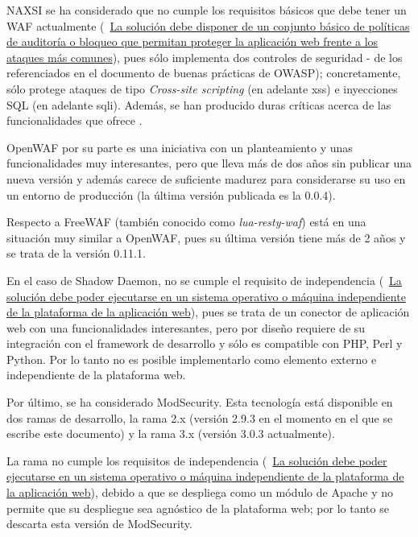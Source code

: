 \par NAXSI se ha considerado que no cumple los requisitos básicos que debe tener un WAF actualmente ({~\hyperref[req:commonattacks]{La solución debe
disponer de un conjunto básico de políticas de auditoría o bloqueo que permitan proteger la aplicación web frente a los ataques más comunes}}), pues
sólo implementa dos controles de seguridad - de los referenciados en el documento de buenas prácticas de OWASP\cite[apartado A3.2]{owaspbestpractices});
concretamente, sólo protege ataques de tipo {\em Cross-site scripting} (en adelante \acrshort{xss}\cite{owaspxss}) e inyecciones SQL (en adelante
\acrshort{sqli}\cite{owaspsqli}). Además, se han producido duras críticas acerca de las funcionalidades que ofrece \cite{naxsianalisis}.

\par OpenWAF por su parte es una iniciativa con un planteamiento y unas funcionalidades muy interesantes, pero que lleva más de dos años sin
publicar una nueva versión y además carece de suficiente madurez para considerarse su uso en un entorno de producción (la última versión
publicada es la 0.0.4).

\par Respecto a FreeWAF (también conocido como {\em lua-resty-waf}) está en una situación muy similar a OpenWAF, pues su última versión tiene más de 2
años y se trata de la versión 0.11.1\cite{freewafchangelog}.

\par En el caso de Shadow Daemon, no se cumple el requisito de independencia ({~\hyperref[req:independence]{La solución debe poder ejecutarse en un
sistema operativo o máquina independiente de la plataforma de la aplicación web}}), pues se trata de un conector de aplicación web con una
funcionalidades interesantes, pero por diseño requiere de su integración con el framework de desarrollo y sólo es compatible con PHP, Perl y Python. Por
lo tanto no es posible implementarlo como elemento externo e independiente de la plataforma web.

\par Por último, se ha considerado ModSecurity. Esta tecnología está disponible en dos ramas de desarrollo, la rama 2.x (versión 2.9.3 en el momento en
el que se escribe este documento) y la rama 3.x (versión 3.0.3 actualmente).
\par La rama no cumple los requisitos de independencia ({~\hyperref[req:independence]{La solución debe poder ejecutarse en un sistema operativo o
máquina independiente de la plataforma de la aplicación web}}), debido a que se despliega como un módulo de Apache y no permite que su despliegue sea
agnóstico de la plataforma web; por lo tanto se descarta esta versión de ModSecurity.


